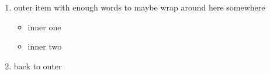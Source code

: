 \begin{enumerate}
\item outer item with enough words to maybe wrap around here somewhere
\begin{itemize}
\item inner one
\item inner two
\end{itemize}
\item back to outer
\end{enumerate}
